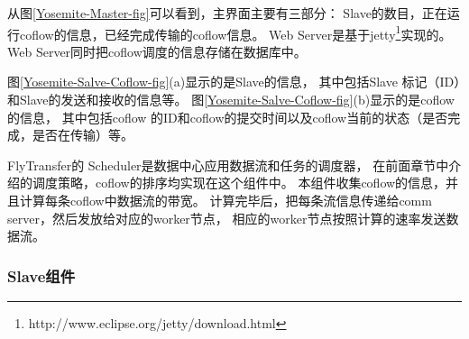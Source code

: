 从图\ref{Yosemite-Master-fig}可以看到，主界面主要有三部分：
Slave的数目，正在运行coflow的信息，已经完成传输的coflow信息。
Web Server是基于jetty\footnote{http://www.eclipse.org/jetty/download.html}实现的。
Web Server同时把coflow调度的信息存储在数据库中。

图\ref{Yosemite-Salve-Coflow-fig}(a)显示的是Slave的信息，
其中包括Slave 标记（ID）和Slave的发送和接收的信息等。
图\ref{Yosemite-Salve-Coflow-fig}(b)显示的是coflow的信息，
其中包括coflow 的ID和coflow的提交时间以及coflow当前的状态（是否完成，是否在传输）等。

FlyTransfer的 Scheduler是数据中心应用数据流和任务的调度器，
在前面章节中介绍的调度策略，coflow的排序均实现在这个组件中。
本组件收集coflow的信息，并且计算每条coflow中数据流的带宽。
计算完毕后，把每条流信息传递给comm server，然后发放给对应的worker节点，
相应的worker节点按照计算的速率发送数据流。


\subsubsection{Slave组件}


